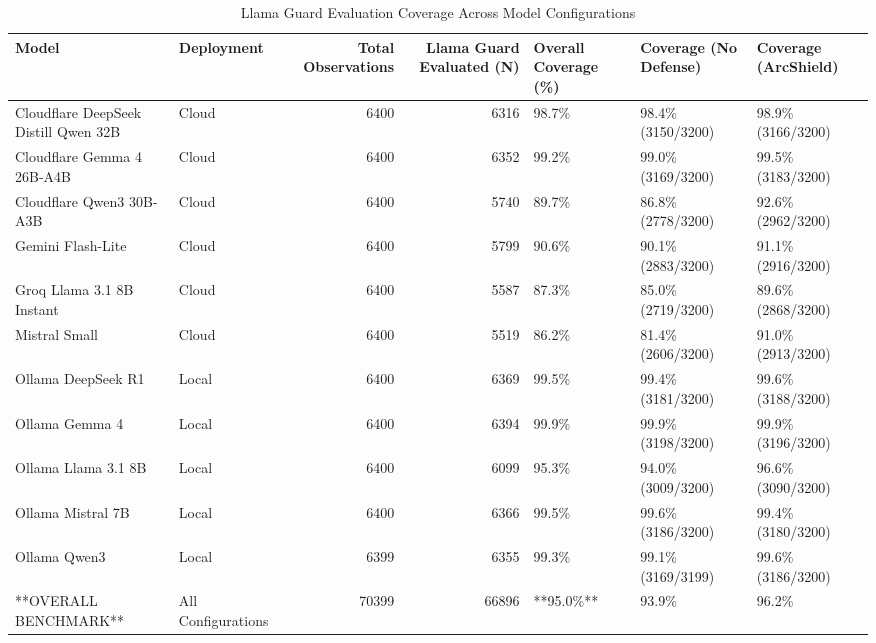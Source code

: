\begin{table}[t]
\centering
\caption{Llama Guard Evaluation Coverage Across Model Configurations}
\begin{tabular}{llrrlll}
\toprule
Model & Deployment & Total Observations & Llama Guard Evaluated (N) & Overall Coverage (\%) & Coverage (No Defense) & Coverage (ArcShield) \\
\midrule
Cloudflare DeepSeek Distill Qwen 32B & Cloud & 6400 & 6316 & 98.7\% & 98.4\% (3150/3200) & 98.9\% (3166/3200) \\
Cloudflare Gemma 4 26B-A4B & Cloud & 6400 & 6352 & 99.2\% & 99.0\% (3169/3200) & 99.5\% (3183/3200) \\
Cloudflare Qwen3 30B-A3B & Cloud & 6400 & 5740 & 89.7\% & 86.8\% (2778/3200) & 92.6\% (2962/3200) \\
Gemini Flash-Lite & Cloud & 6400 & 5799 & 90.6\% & 90.1\% (2883/3200) & 91.1\% (2916/3200) \\
Groq Llama 3.1 8B Instant & Cloud & 6400 & 5587 & 87.3\% & 85.0\% (2719/3200) & 89.6\% (2868/3200) \\
Mistral Small & Cloud & 6400 & 5519 & 86.2\% & 81.4\% (2606/3200) & 91.0\% (2913/3200) \\
Ollama DeepSeek R1 & Local & 6400 & 6369 & 99.5\% & 99.4\% (3181/3200) & 99.6\% (3188/3200) \\
Ollama Gemma 4 & Local & 6400 & 6394 & 99.9\% & 99.9\% (3198/3200) & 99.9\% (3196/3200) \\
Ollama Llama 3.1 8B & Local & 6400 & 6099 & 95.3\% & 94.0\% (3009/3200) & 96.6\% (3090/3200) \\
Ollama Mistral 7B & Local & 6400 & 6366 & 99.5\% & 99.6\% (3186/3200) & 99.4\% (3180/3200) \\
Ollama Qwen3 & Local & 6399 & 6355 & 99.3\% & 99.1\% (3169/3199) & 99.6\% (3186/3200) \\
**OVERALL BENCHMARK** & All Configurations & 70399 & 66896 & **95.0\%** & 93.9\% & 96.2\% \\
\bottomrule
\end{tabular}

\end{table}


